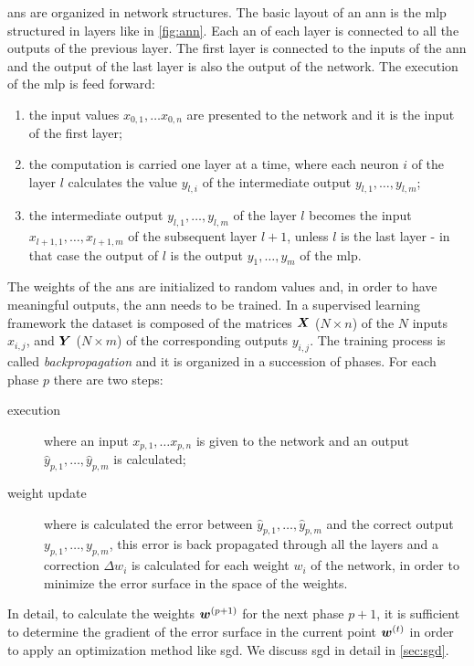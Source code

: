 \acp{an} are organized in network structures. The basic layout of
an  \ac{ann} is the \acf{mlp} structured in layers like in
\cref{fig:ann}. Each \ac{an} of each layer is connected to all the
outputs of the previous layer. The first layer is connected to the
inputs of the \ac{ann} and the output of the last layer is also the
output of the network. The execution of the \ac{mlp} is feed forward:
\begin{enumerate}
\item the input values $x_{0,1},\dots x_{0,n}$ are presented to the
  network and it is the input of the first layer;
\item  the computation is 
  carried one layer at a time, where each neuron $i$ of the layer $l$
  calculates the value $y_{l,i}$ of the intermediate output
  $y_{l,1},\dots,y_{l,m}$;
\item the intermediate output $y_{l,1},\dots,y_{l,m}$ of the layer $l$
  becomes the 
  input $x_{l+1,1},\dots,x_{l+1,m}$ of the subsequent layer $l+1$,
  unless $l$ is the last layer - in that case the output of $l$ is the
  output $y_1,\dots,y_m$ of the \ac{mlp}.
\end{enumerate}

The weights of the \acp{an} are initialized to random values and, in order
to have meaningful outputs, the \ac{ann} needs to be trained. In a
supervised learning framework the dataset is composed of the matrices
$\bm{X}$ ($N\times n$) of the $N$ inputs $x_{i,j}$, and $\bm{Y}$
($N\times m$) of 
the corresponding outputs $y_{i,j}$. The
training process is called \emph{backpropagation} and it is organized in a
succession of phases. For each phase $p$ there are two steps:
\begin{description}
\item[execution] where an input $x_{p,1},\dots x_{p,n}$ is given to
  the network and an output $\hat{y}_{p,1},\dots,\hat{y}_{p,m}$ is calculated;
\item[weight update] where is calculated the error between
  $\hat{y}_{p,1},\dots,\hat{y}_{p,m}$ and the correct output
  $y_{p,1},\dots,y_{p,m}$, this error is back propagated through all
  the layers and a correction $\Delta w_i$ is calculated for each weight $w_i$ of
  the network, in
  order to minimize the error surface in the space of the weights.
\end{description}
In detail, to calculate the weights $\bm{w}^{(p+1)}$ for the next
phase $p+1$, it is 
sufficient to determine the gradient of 
the error surface in the current point $\bm{w}^{(t)}$ in order to
apply an optimization method like \ac{sgd}. We discuss \ac{sgd} in
detail in \cref{sec:sgd}.

